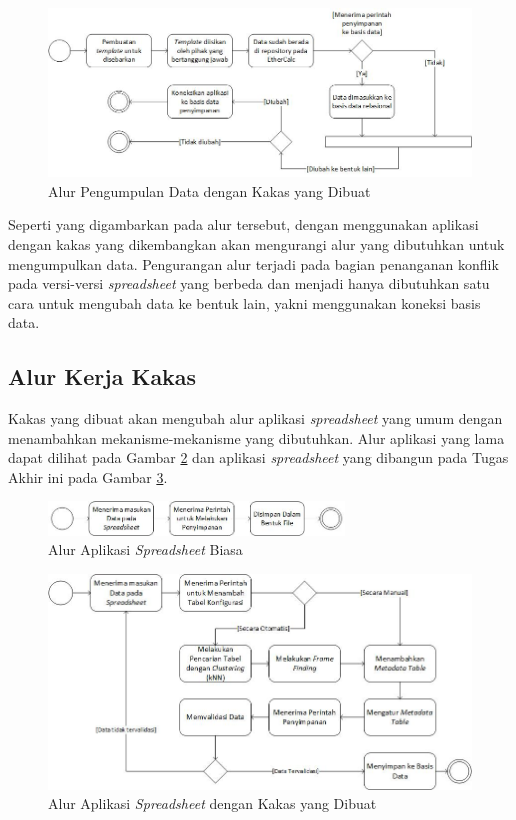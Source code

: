 \begin{figure}[htb]
    \centering
    \includegraphics[width=1\textwidth]{resources/chapter-3-workflow-kerja.jpg}
    \caption{Alur Pengumpulan Data dengan Kakas yang Dibuat}
	\label{GambarWorkflowKerja}
\end{figure}

Seperti yang digambarkan pada alur tersebut, dengan menggunakan aplikasi dengan kakas yang dikembangkan akan mengurangi alur yang dibutuhkan untuk mengumpulkan data. Pengurangan alur terjadi pada bagian penanganan konflik pada versi-versi \textit{spreadsheet} yang berbeda dan menjadi hanya dibutuhkan satu cara untuk mengubah data ke bentuk lain, yakni menggunakan koneksi basis data.

\subsection{Alur Kerja Kakas}
Kakas yang dibuat akan mengubah alur aplikasi \textit{spreadsheet} yang umum dengan menambahkan mekanisme-mekanisme yang dibutuhkan. Alur aplikasi yang lama dapat dilihat pada Gambar \ref{GambarWorkflowBiasa} dan aplikasi \textit{spreadsheet} yang dibangun pada Tugas Akhir ini pada Gambar \ref{GambarWorkflow}.

\begin{figure}[htb]
    \centering
    \includegraphics[width=0.7\textwidth]{resources/chapter-3-workflow-biasa.jpg}
    \caption{Alur Aplikasi \textit{Spreadsheet} Biasa}
	\label{GambarWorkflowBiasa}
\end{figure}

\begin{figure}[htb]
    \centering
    \includegraphics[width=1\textwidth]{resources/chapter-3-workflow.jpg}
    \caption{Alur Aplikasi \textit{Spreadsheet} dengan Kakas yang Dibuat}
	\label{GambarWorkflow}
\end{figure}

